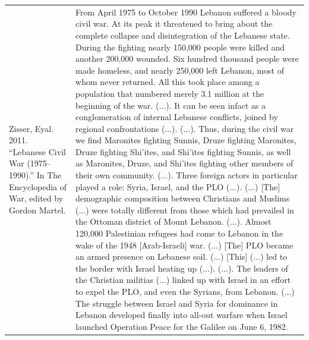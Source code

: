 {\begin{longtable}{p{}p{}}
Zisser, Eyal. 2011. “Lebanese Civil War (1975–1990).” In The Encyclopedia of War, edited by Gordon Martel. & From April 1975 to October 1990 Lebanon suffered a bloody civil war. At its peak it threatened to bring about the complete collapse and disintegration of the Lebanese state. During the fighting nearly 150,000 people were killed and another 200,000 wounded. Six hundred thousand people were made homeless, and nearly 250,000 left Lebanon, most of whom never returned. All this took place among a population that numbered merely 3.1 million at the beginning of the war. (...). It can be seen infact as a conglomeration of internal Lebanese conflicts, joined by regional confrontations (...). (...). Thus, during the civil war we find Maronites fighting Sunnis, Druze fighting Maronites, Druze fighting Shi'ites, and Shi'ites fighting Sunnis, as well as Maronites, Druze, and Shi'ites fighting other members of their own community. (...). Three foreign actors in particular played a role: Syria, Israel, and the PLO (...). (...) [The] demographic composition between Christians and Muslims (...) were totally different from those which had prevailed in the Ottoman district of Mount Lebanon. (...). Almost 120,000 Palestinian refugees had come to Lebanon in the wake of the 1948 [Arab-Israeli] war. (...) [The] PLO became an armed presence on Lebanese soil. (...) [This] (...) led to the border with Israel heating up (...). (...). The leaders of the Christian militias (...) linked up with Israel in an effort to expel the PLO, and even the Syrians, from Lebanon. (...) The struggle between Israel and Syria for dominance in Lebanon developed finally into all-out warfare when Israel launched Operation Peace for the Galilee on June 6, 1982.
\\

\end{longtable}}

